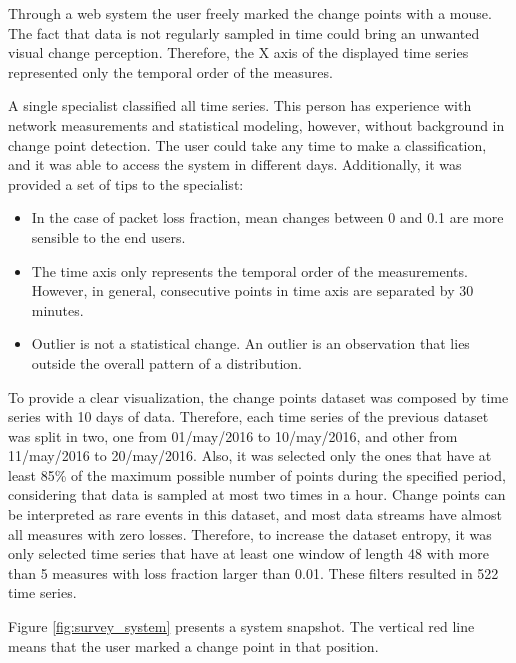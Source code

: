 Through a web system the user freely marked the change points with a mouse. The fact that data is not regularly sampled in time could bring an unwanted visual change perception. Therefore, the X axis of the displayed time series represented only the temporal order of the measures. 

A single specialist classified all time series. This person has experience with network measurements and statistical modeling, however, without background in change point detection. The user could take any time to make a classification, and it was able to access the system in different days. Additionally, it was provided a set of tips to the specialist: 

\begin{itemize}
    \item In the case of packet loss fraction, mean changes between 0 and 0.1 are more sensible to the end users.
    \item The time axis only represents the temporal order of the measurements. However, in general, consecutive points in time axis are separated by 30 minutes.
    \item Outlier is not a statistical change. An outlier is an observation that lies outside the overall pattern of a distribution.
\end{itemize}

To provide a clear visualization, the change points dataset was composed by time series with 10 days of data. Therefore, each time series of the previous dataset was split in two, one from 01/may/2016 to 10/may/2016, and other from 11/may/2016 to 20/may/2016. Also, it was selected only the ones that have at least 85\% of the maximum possible number of points during the specified period, considering that data is sampled at most two times in a hour. Change points can be interpreted as rare events in this dataset, and most data streams have almost all measures with zero losses. Therefore, to increase the dataset entropy, it was only selected time series that have at least one window of length 48 with more than 5 measures with loss fraction larger than 0.01. These filters resulted in 522 time series.

Figure \ref{fig:survey_system} presents a system snapshot. The vertical red line means that the user marked a change point in that position.

